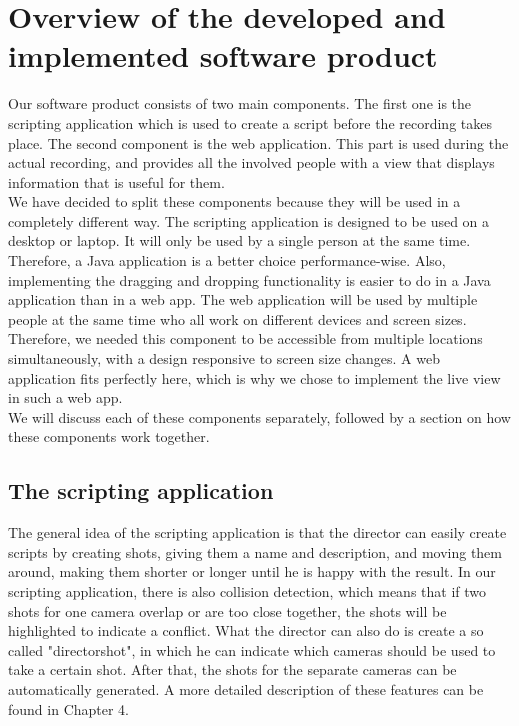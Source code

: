 \section{Overview of the developed and implemented software product}

Our software product consists of two main components. The first one is the scripting application which is used to create a script before the recording takes place. The second component is the web application. This part is used during the actual recording, and provides all the involved people with a view that displays information that is useful for them.\\
 We have decided to split these components because they will be used in a completely different way. The scripting application is designed to be used on a desktop or laptop. It will only be used by a single person at the same time. Therefore, a Java application is a better choice performance-wise. Also, implementing the dragging and dropping functionality is easier to do in a Java application than in a web app. The web application will be used by multiple people at the same time who all work on different devices and screen sizes. Therefore, we needed this component to be accessible from multiple locations simultaneously, with a design responsive to screen size changes. A web application fits perfectly here, which is why we chose to implement the live view in such a web app.\\
We will discuss each of these components separately, followed by a section on how these components work together.

\subsection{The scripting application}
The general idea of the scripting application is that the director can easily create scripts by creating shots, giving them a name and description, and moving them around, making them shorter or longer until he is happy with the result. In our scripting application, there is also collision detection, which means that if two shots for one camera overlap or are too close together, the shots will be highlighted to indicate a conflict. What the director can also do is create a so called "directorshot", in which he can indicate which cameras should be used to take a certain shot. After that, the shots for the separate cameras can be automatically generated. A more detailed description of these features can be found in Chapter 4.

